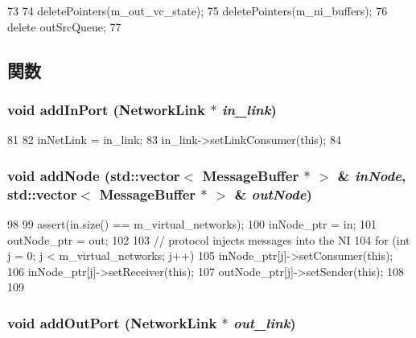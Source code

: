 \begin{DoxyCode}
73 {
74     deletePointers(m_out_vc_state);
75     deletePointers(m_ni_buffers);
76     delete outSrcQueue;
77 }
\end{DoxyCode}


\subsection{関数}
\hypertarget{classNetworkInterface_a861b99bda673a31b1b48132ed9369f28}{
\subsubsection[{addInPort}]{\setlength{\rightskip}{0pt plus 5cm}void addInPort ({\bf NetworkLink} $\ast$ {\em in\_\-link})}}
\label{classNetworkInterface_a861b99bda673a31b1b48132ed9369f28}



\begin{DoxyCode}
81 {
82     inNetLink = in_link;
83     in_link->setLinkConsumer(this);
84 }
\end{DoxyCode}
\hypertarget{classNetworkInterface_abb78e667f7f184a1989354ba522d32a9}{
\subsubsection[{addNode}]{\setlength{\rightskip}{0pt plus 5cm}void addNode ({\bf std::vector}$<$ {\bf MessageBuffer} $\ast$ $>$ \& {\em inNode}, \/  {\bf std::vector}$<$ {\bf MessageBuffer} $\ast$ $>$ \& {\em outNode})}}
\label{classNetworkInterface_abb78e667f7f184a1989354ba522d32a9}



\begin{DoxyCode}
98 {
99     assert(in.size() == m_virtual_networks);
100     inNode_ptr = in;
101     outNode_ptr = out;
102 
103     // protocol injects messages into the NI
104     for (int j = 0; j < m_virtual_networks; j++) {
105         inNode_ptr[j]->setConsumer(this);
106         inNode_ptr[j]->setReceiver(this);
107         outNode_ptr[j]->setSender(this);
108     }
109 }
\end{DoxyCode}
\hypertarget{classNetworkInterface_ab38acc0d5f8c54260955ae391bb77715}{
\subsubsection[{addOutPort}]{\setlength{\rightskip}{0pt plus 5cm}void addOutPort ({\bf NetworkLink} $\ast$ {\em out\_\-link})}}
\label{classNetworkInterface_ab38acc0d5f8c54260955ae391bb77715}



